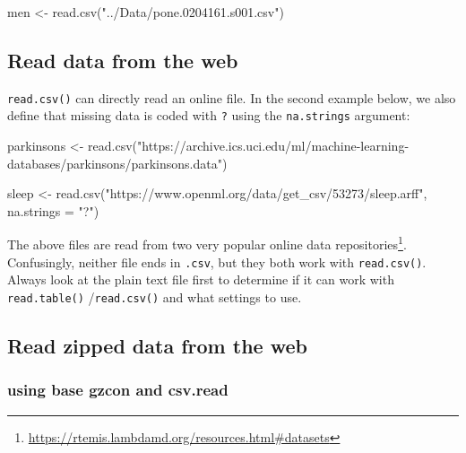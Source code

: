 \documentclass[
]{book}
\newenvironment{Shaded}{\begin{snugshade}}{\end{snugshade}}
\newcommand{\AttributeTok}[1]{\textcolor[rgb]{0.77,0.63,0.00}{#1}}
\newcommand{\FunctionTok}[1]{\textcolor[rgb]{0.00,0.00,0.00}{#1}}
\newcommand{\NormalTok}[1]{#1}
\newcommand{\OtherTok}[1]{\textcolor[rgb]{0.56,0.35,0.01}{#1}}
\newcommand{\StringTok}[1]{\textcolor[rgb]{0.31,0.60,0.02}{#1}}
\DeclareRobustCommand{\href}[2]{#2\footnote{\url{#1}}}
\renewcommand{\href}[2]{#2\footnote{\url{#1}}}
\begin{document}
\begin{Shaded}
\begin{Highlighting}[]
\NormalTok{men }\OtherTok{\textless{}{-}}  \FunctionTok{read.csv}\NormalTok{(}\StringTok{"../Data/pone.0204161.s001.csv"}\NormalTok{)}
\end{Highlighting}
\end{Shaded}

\hypertarget{read-data-from-the-web}{%
\subsection{Read data from the web}\label{read-data-from-the-web}}

\texttt{read.csv()} can directly read an online file. In the second example below, we also define that missing data is coded with \texttt{?} using the \texttt{na.strings} argument:

\begin{Shaded}
\begin{Highlighting}[]
\NormalTok{parkinsons }\OtherTok{\textless{}{-}} \FunctionTok{read.csv}\NormalTok{(}\StringTok{"https://archive.ics.uci.edu/ml/machine{-}learning{-}databases/parkinsons/parkinsons.data"}\NormalTok{)}

\NormalTok{sleep }\OtherTok{\textless{}{-}} \FunctionTok{read.csv}\NormalTok{(}\StringTok{"https://www.openml.org/data/get\_csv/53273/sleep.arff"}\NormalTok{,}
                  \AttributeTok{na.strings =} \StringTok{"?"}\NormalTok{)}
\end{Highlighting}
\end{Shaded}

The above files are read from two very popular online \href{https://rtemis.lambdamd.org/resources.html\#datasets}{data repositories}. Confusingly, neither file ends in \texttt{.csv}, but they both work with \texttt{read.csv()}. Always look at the plain text file first to determine if it can work with \texttt{read.table()} /\texttt{read.csv()} and what settings to use.

\hypertarget{read-zipped-data-from-the-web}{%
\subsection{Read zipped data from the web}\label{read-zipped-data-from-the-web}}

\hypertarget{using-base-gzcon-and-csv.read}{%
\subsubsection{using base gzcon and csv.read}\label{using-base-gzcon-and-csv.read}}
\end{document}
